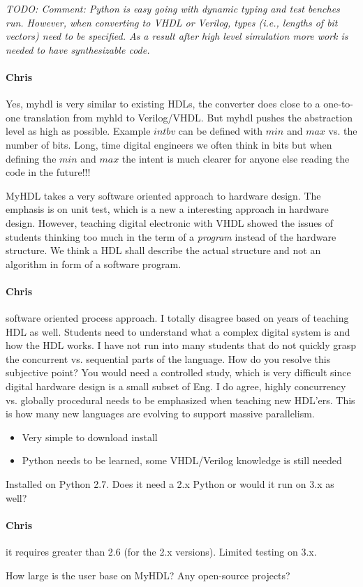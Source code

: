 \documentclass[a4paper, conference]{IEEEtran}
\newcommand{\todo}[1]{{\emph{TODO: #1}}}
\newcommand{\comment}[3]{\paragraph*{\textbf{#1}}{\color{#3}#2}}
\newcommand{\cfelton}[1]{\comment{Chris}{#1}{Blue}}
\begin{document}
\todo{Comment: Python is easy going with dynamic typing and test benches run.
However, when converting to VHDL or Verilog, types (i.e., lengths of bit vectors)
need to be specified. As a result after high level simulation more work is needed
to have synthesizable code.}

\cfelton{Yes, myhdl is very similar to existing HDLs, the converter does close 
to a one-to-one translation from myhld to Verilog/VHDL.  But myhdl pushes the 
abstraction level as high as possible.  Example $intbv$ can be defined with 
$min$ and $max$ vs. the number of bits.  Long, time digital engineers we often
think in bits but when defining the $min$ and $max$ the intent is much clearer
for anyone else reading the code in the future!!!}

MyHDL takes a very software oriented approach to hardware design. The emphasis
is on unit test, which is a new a interesting approach in hardware design.
However, teaching digital electronic with VHDL showed the issues of students
thinking too much in the term of a \emph{program} instead of the hardware
structure. We think a HDL shall describe the actual structure and not an
algorithm in form of a software program.

\cfelton{software oriented \b{process} approach.  I totally disagree based on 
years of teaching HDL as well.  Students need to understand what a complex
digital system is and how the HDL works.  I have not run into many students
that do not quickly grasp the concurrent vs. sequential parts of the language.
How do you resolve this subjective point?  You would need a controlled study,
which is very difficult since digital hardware design is a small subset of 
Eng.  I do agree, highly concurrency vs. globally procedural needs to be 
emphasized when teaching new HDL'ers.  This is how many new languages are
evolving to support massive parallelism.}

\begin{itemize}
\item Very simple to download install
\item Python needs to be learned, some VHDL/Verilog knowledge is still needed
\end{itemize}

Installed on Python 2.7. Does it need a 2.x Python or would it run on 3.x as well?

\cfelton{it requires greater than 2.6 (for the 2.x versions).  Limited testing 
on 3.x.}

How large is the user base on MyHDL? Any open-source projects?
\end{document}
